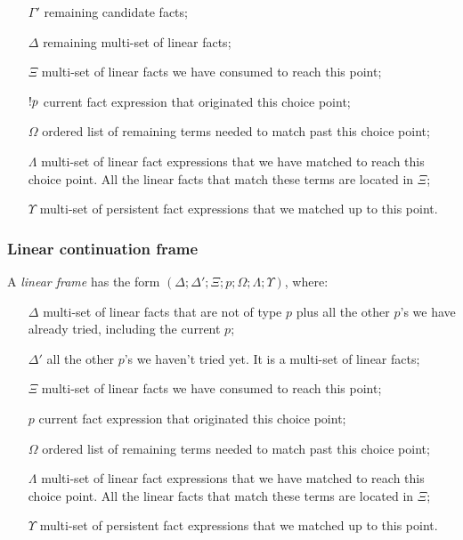 \begin{enumerate}

   \item[$\Gamma'$] remaining candidate facts;

   \item[$\Delta$] remaining multi-set of linear facts;

   \item[$\Xi$] multi-set of linear facts we have consumed to reach this point;

   \item[${!} p$] current fact expression that originated this choice point;

   \item[$\Omega$] ordered list of remaining terms needed to match past this
   choice point;

   \item[$\Lambda$] multi-set of linear fact expressions that we have matched to
   reach this choice point. All the linear facts that match these terms are
   located in $\Xi$;

   \item[$\Upsilon$] multi-set of persistent fact expressions that we matched up
   to this point.

\end{enumerate}

\subsubsection{Linear continuation frame}

A \emph{linear frame} has the form $(\Delta; \Delta'; \Xi; p; \Omega; \Lambda;
\Upsilon)$, where:

\begin{enumerate}

   \item[$\Delta$] multi-set of linear facts that are not of type $p$ plus all
   the other $p$'s we have already tried, including the current $p$;

   \item[$\Delta'$] all the other $p$'s we haven't tried yet. It is a multi-set
   of linear facts;

   \item[$\Xi$] multi-set of linear facts we have consumed to reach this point;

   \item[$p$] current fact expression that originated this choice point;

   \item[$\Omega$] ordered list of remaining terms needed to match past this
   choice point;

   \item[$\Lambda$] multi-set of linear fact expressions that we have matched to
   reach this choice point. All the linear facts that match these terms are
   located in $\Xi$;

   \item[$\Upsilon$] multi-set of persistent fact expressions that we matched up
   to this point.

\end{enumerate}

